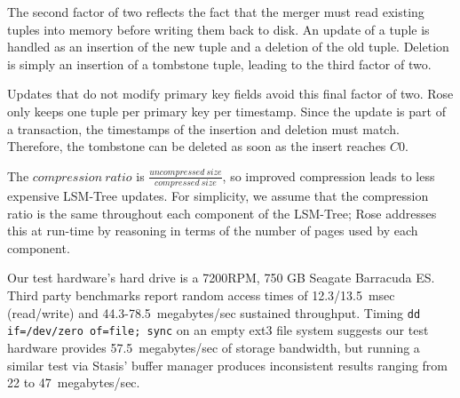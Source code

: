 \documentclass{vldb}
\newcommand{\rows}{Rose\xspace}
\begin{document}
The second factor of two reflects the fact that the merger must read
existing tuples into memory before writing them back to disk.
An update of a tuple is handled as an insertion of the new
tuple and a deletion of the old tuple.  Deletion is simply an insertion
of a tombstone tuple, leading to the third factor of two.

Updates that do not modify primary key fields avoid this final factor of two.
\rows only keeps one tuple per primary key per timestamp.  Since the
update is part of a transaction, the timestamps of the insertion and
deletion must match.  Therefore, the tombstone can be deleted as soon
as the insert reaches $C0$.

%
%
%

The $compression~ratio$ is
$\frac{uncompressed~size}{compressed~size}$, so improved compression
leads to less expensive LSM-Tree updates.  For simplicity, we assume
that the compression ratio is the same throughout each component of
the LSM-Tree; \rows addresses this at run-time by reasoning in terms
of the number of pages used by each component.

Our test hardware's hard drive is a 7200RPM, 750 GB Seagate Barracuda
ES.  
Third party
benchmarks\cite{hdBench} %
report random access times of 12.3/13.5~msec (read/write) and 44.3-78.5~megabytes/sec
sustained throughput.  Timing {\tt dd if=/dev/zero of=file; sync} on an
empty ext3 file system suggests our test hardware provides 57.5~megabytes/sec of
storage bandwidth, but running a similar test via Stasis' buffer manager produces
inconsistent results ranging from 22 to 47~megabytes/sec.

\end{document}
